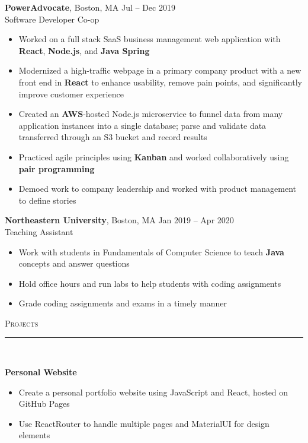 \documentclass[11pt]{article}
\begin{document}
\begin{raggedright}
	
	\textbf{\large PowerAdvocate}, Boston, MA \hfill Jul -- Dec 2019 \\
	Software Developer Co-op \\
		\begin{itemize}
		\item Worked on a full stack SaaS business management web application with \textbf{React}, \textbf{Node.js}, and \textbf{Java Spring}
		\item Modernized a high-traffic webpage in a primary company product with a new front end in \textbf{React} to enhance usability, remove pain points, and significantly improve customer experience
		\item Created an \textbf{AWS}-hosted Node.js microservice to funnel data from many application instances into a single database; parse and validate data transferred through an S3 bucket and record results
		\item Practiced agile principles using \textbf{Kanban} and worked collaboratively using \textbf{pair programming}
		\item Demoed work to company leadership and worked with product management to define stories
		\end{itemize}
	\vspace{0.1in}

	\textbf{\large Northeastern University}, Boston, MA \hfill Jan 2019 -- Apr 2020 \\
	Teaching Assistant
	\begin{itemize}
		\item Work with students in Fundamentals of Computer Science to teach \textbf{Java} concepts and answer questions
		\item Hold office hours and run labs to help students with coding assignments
		\item Grade coding assignments and exams in a timely manner	\end{itemize}
	\vspace{0.1in}
	
	\textsc{\Large Projects} \\
	\vspace{-0.1in}
	\rule{\textwidth}{0.4pt} \\
	\vspace{0.05in}
	
	\textbf{\large Personal Website} 
	\begin{itemize}
		\item Create a personal portfolio website using JavaScript and React, hosted on GitHub Pages
		\item Use ReactRouter to handle multiple pages and MaterialUI for design elements
	\end{itemize}
	\vspace{0.1in}
	

\end{raggedright}
\end{document}
